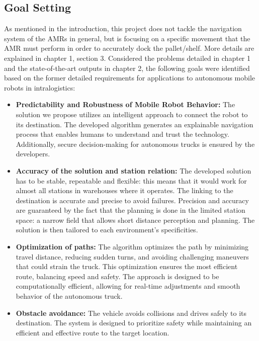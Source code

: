 \subsection{Goal Setting}
As mentioned in the introduction, this project does not tackle the navigation system of the AMRs in 
general, but is focusing on a specific movement that the AMR must perform in order to accurately dock the pallet/shelf. 
More details are explained in chapter 1, section 3.
Considered the problems detailed in chapter 1 and the state-of-the-art outputs in chapter 2, 
the following goals were identified 
based on the former detailed requirements for applications to autonomous mobile robots in intralogistics:
\begin{itemize}
    \item \textbf{Predictability and Robustness of Mobile Robot Behavior: }The solution we propose utilizes an intelligent approach to connect 
    the robot to its destination. The developed algorithm generates an explainable navigation process that enables humans 
    to understand and trust the technology. Additionally, secure decision-making for autonomous trucks is ensured by the 
    developers. 

    \item \textbf{Accuracy of the solution and station relation: }The developed solution has to be stable, repeatable and flexible: this 
    means that it would work for almost all stations in warehouses where it operates. The linking to the destination is 
    accurate and precise to avoid failures. Precision and accuracy are guaranteed by the fact that the planning is done 
    in the limited station space: a narrow field that allows short distance perception and planning. The solution is 
    then tailored to each environment's specificities. 
    
    \item \textbf{Optimization of paths: }The algorithm optimizes the path by minimizing travel distance, reducing sudden turns, and avoiding challenging maneuvers that could 
    strain the truck. This optimization ensures the most efficient route, balancing speed and safety. The approach is designed to be 
    computationally efficient, allowing for real-time adjustments and smooth behavior of the autonomous truck.

    \item \textbf{Obstacle avoidance: }The vehicle avoids collisions and drives safely to its destination. The system is designed to 
    prioritize safety while maintaining an efficient and effective route to the target location.

\end{itemize}


